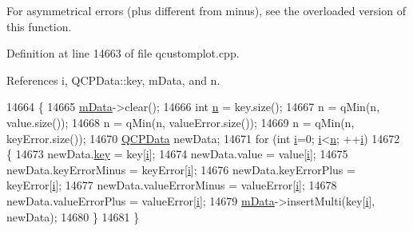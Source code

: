 For asymmetrical errors (plus different from minus), see the overloaded version of this function. 

Definition at line 14663 of file qcustomplot.\+cpp.



References i, Q\+C\+P\+Data\+::key, m\+Data, and n.


\begin{DoxyCode}
14664 \{
14665   \hyperlink{class_q_c_p_graph_a8457c840f69a0ac49f61d30a509c5d08}{mData}->clear();
14666   \textcolor{keywordtype}{int} \hyperlink{_comparision_pictures_2_createtest_image_8m_aeab71244afb687f16d8c4f5ee9d6ef0e}{n} = key.size();
14667   n = qMin(n, value.size());
14668   n = qMin(n, valueError.size());
14669   n = qMin(n, keyError.size());
14670   \hyperlink{class_q_c_p_data}{QCPData} newData;
14671   \textcolor{keywordflow}{for} (\textcolor{keywordtype}{int} \hyperlink{_comparision_pictures_2_createtest_image_8m_a6f6ccfcf58b31cb6412107d9d5281426}{i}=0; \hyperlink{_comparision_pictures_2_createtest_image_8m_a6f6ccfcf58b31cb6412107d9d5281426}{i}<\hyperlink{_comparision_pictures_2_createtest_image_8m_aeab71244afb687f16d8c4f5ee9d6ef0e}{n}; ++\hyperlink{_comparision_pictures_2_createtest_image_8m_a6f6ccfcf58b31cb6412107d9d5281426}{i})
14672   \{
14673     newData.\hyperlink{class_q_c_p_data_a2f5ba9aca61bb74f88516e148a4cf71b}{key} = key[\hyperlink{_comparision_pictures_2_createtest_image_8m_a6f6ccfcf58b31cb6412107d9d5281426}{i}];
14674     newData.value = value[\hyperlink{_comparision_pictures_2_createtest_image_8m_a6f6ccfcf58b31cb6412107d9d5281426}{i}];
14675     newData.keyErrorMinus = keyError[\hyperlink{_comparision_pictures_2_createtest_image_8m_a6f6ccfcf58b31cb6412107d9d5281426}{i}];
14676     newData.keyErrorPlus = keyError[\hyperlink{_comparision_pictures_2_createtest_image_8m_a6f6ccfcf58b31cb6412107d9d5281426}{i}];
14677     newData.valueErrorMinus = valueError[\hyperlink{_comparision_pictures_2_createtest_image_8m_a6f6ccfcf58b31cb6412107d9d5281426}{i}];
14678     newData.valueErrorPlus = valueError[\hyperlink{_comparision_pictures_2_createtest_image_8m_a6f6ccfcf58b31cb6412107d9d5281426}{i}];
14679     \hyperlink{class_q_c_p_graph_a8457c840f69a0ac49f61d30a509c5d08}{mData}->insertMulti(key[\hyperlink{_comparision_pictures_2_createtest_image_8m_a6f6ccfcf58b31cb6412107d9d5281426}{i}], newData);
14680   \}
14681 \}
\end{DoxyCode}
\hypertarget{class_q_c_p_graph_abb75736ecdbf6e6a7501e1da64fb18cf}{}
